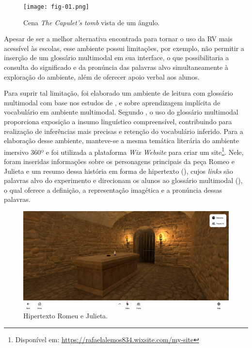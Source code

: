 \begin{figure}[htpb]
    \centering
    \begin{minipage}{.75\textwidth}
    \texttt{[image: fig-01.png]}
    \caption{Cena \emph{The Capulet's tomb} vista de um ângulo.}
    \label{fig-01}
    \end{minipage}
\end{figure}

Apesar de ser a melhor alternativa encontrada para tornar o uso da RV
mais acessível às escolas, esse ambiente possui limitações, por exemplo,
não permitir a inserção de um glossário multimodal em sua interface, o
que possibilitaria a consulta do significado e da pronúncia das palavras
alvo simultaneamente à exploração do ambiente, além de oferecer apoio
verbal aos alunos.

Para suprir tal limitação, foi elaborado um ambiente de leitura com
glossário multimodal com base nos estudos de \textcite{souza2004}, \textcite{saito2015}
e \textcite{procopio2016} sobre aprendizagem implícita de vocabulário em
ambiente multimodal. Segundo \textcite{procopio2016}, o uso do glossário
multimodal proporciona exposição a insumo linguístico compreensível,
contribuindo para realização de inferências mais precisas e retenção do
vocabulário inferido. Para a elaboração desse ambiente, manteve-se a
mesma temática literária do ambiente imersivo 360º e foi utilizada a
plataforma \emph{Wix Website} para criar um site\footnote{Disponível em:
  \url{https://rafaelalemos834.wixsite.com/my-site}}. Nele, foram
inseridas informações sobre os personagens principais da peça Romeo e
Julieta e um resumo dessa história em forma de hipertexto (),
cujos \emph{links} são palavras alvo do experimento e direcionam os
alunos ao glossário multimodal (), o qual oferece a definição, a
representação imagética e a pronúncia dessas palavras.

\begin{figure}[htpb]
    \centering
    \begin{minipage}{.75\textwidth}
    \includegraphics[width=\textwidth]{fig-02.png}
    \caption{Hipertexto Romeu e Julieta.}
    \label{fig-02}
    \end{minipage}
\end{figure}

